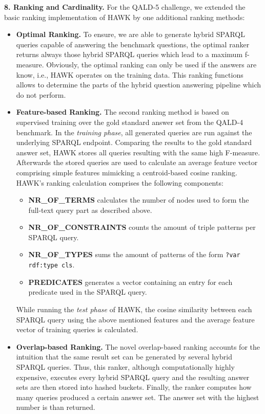 \textbf{8. Ranking and Cardinality.}
For the QALD-5 challenge, we extended the basic ranking implementation of HAWK by one additional ranking methods:
\begin{itemize}
\item \textbf{Optimal Ranking.} To ensure, we are able to generate hybrid SPARQL queries capable of answering the benchmark questions, the optimal ranker returns always those hybrid SPARQL queries which lead to a maximum f-measure.  
    Obviously, the optimal ranking can only be used if the answers are know, i.e., HAWK operates on the training data.
    This ranking functions allows to determine the parts of the hybrid question answering pipeline which do not perform. 
\item \textbf{Feature-based Ranking.} The second ranking method is based on supervised training over the gold standard answer set from the QALD-4 benchmark.
    In the \emph{training phase}, all generated queries are run against the underlying SPARQL endpoint. 
    Comparing the results to the gold standard answer set, HAWK stores all queries resulting with the same high F-measure.
    Afterwards the stored queries are used to calculate an average feature vector comprising simple features mimicking a centroid-based cosine ranking.
    HAWK's ranking calculation comprises the following components:
    \begin{itemize}
    \item \textbf{NR\_OF\_TERMS} calculates the number of nodes used to form the full-text query part as described above.
    \item \textbf{NR\_OF\_CONSTRAINTS} counts the amount of triple patterns per SPARQL query.
    \item \textbf{NR\_OF\_TYPES} sums the amount of patterns of the form \texttt{?var rdf:type cls}.
    \item \textbf{PREDICATES} generates a vector containing an entry for each predicate used in the SPARQL query.
    \end{itemize}
    While running the \emph{test phase} of HAWK, the cosine similarity between each SPARQL query using the above mentioned features and the average feature vector of training queries is calculated.
\item \textbf{Overlap-based Ranking.} The novel overlap-based ranking accounts for the intuition that the same result set can be generated by several hybrid SPARQL queries. 
    Thus, this ranker, although computationally highly expensive, executes every hybrid SPARQL query and the resulting answer sets are then stored into hashed buckets. 
    Finally, the ranker computes how many queries produced a certain answer set. 
    The answer set with the highest number is than returned.
\end{itemize}
